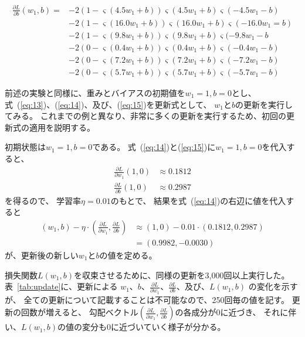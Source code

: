 \begin{align}
  \frac{\partial L}{\partial b}(w_1, b) =
  &\nonumber
    -2 \left(1 - \varsigma(4.5 w_1 + b)\right)\varsigma(4.5 w_1 + b)\varsigma(- 4.5 w_1 - b)
  \\&\nonumber
  -2 \left(1 - \varsigma(16.0 w_1 + b)\right) \varsigma(16.0 w_1 + b)\varsigma(- 16.0 w_1 = b)
  \\&\nonumber
  -2 \left(1 - \varsigma(9.8 w_1 + b)\right)\varsigma(9.8 w_1 + b)\varsigma(- 9.8 w_1 - b
  \\&\nonumber
  -2 \left(0 - \varsigma(0.4 w_1 + b)\right)\varsigma(0.4 w_1 + b)\varsigma(- 0.4 w_1 - b)
  \\&\nonumber
  -2 \left(0 - \varsigma(7.2 w_1 + b)\right)\varsigma(7.2 w_1 + b)\varsigma(- 7.2 w_1 - b)
  \\&\label{eq:15}
  -2 \left(0 - \varsigma(5.7 w_1 + b)\right)\varsigma(5.7 w_1 + b)\varsigma(- 5.7 w_1 - b)
\end{align}

前述の実験と同様に、重みとバイアスの初期値を$w_1 = 1, b = 0$とし、
式~(\ref{eq:13})、(\ref{eq:14})、及び、(\ref{eq:15})を更新式として、
$w_1$と$b$の更新を実行してみる。
これまでの例と異なり、非常に多くの更新を実行するため、初回の更新式の適用を説明する。

初期状態は$w_1 = 1, b = 0$である。
式~(\ref{eq:14})と(\ref{eq:15})に$w_1 = 1, b = 0$を代入すると、
\begin{align*}
    \frac{\partial L}{\partial w_1}(1, 0) & \approx 0.1812
  \\
    \frac{\partial L}{\partial b}(1, 0) & \approx 0.2987
\end{align*}  
を得るので、
学習率$\eta = 0.01$のもとで、
結果を式~(\ref{eq:14})の右辺に値を代入すると
\begin{align*}
  (w_1, b) - \eta \cdot \left(\frac{\partial L}{\partial w_1},
  \frac{\partial L}{\partial b}\right)
  &
  \approx
    (1, 0) - 0.01 \cdot (0.1812, 0.2987)
  \\&
  = (0.9982, -0.0030)
\end{align*}
が、更新後の新しい$w_1$と$b$の値を定める。

損失関数$L(w_1, b)$を収束させるために、同様の更新を3,000回以上実行した。
表~\ref{tab:update}に、更新による
$w_1$、$b$、$\frac{\partial L}{\partial w_1}$、$\frac{\partial L}{\partial b}$、及び、$L(w_1, b)$
の変化を示すが、
全ての更新について記載することは不可能なので、250回毎の値を記す。
更新の回数が増えると、
勾配ベクトル$(\frac{\partial L}{\partial w_1}, \frac{\partial L}{\partial b})$の各成分が0に近づき、
それに伴い、$L(w_1, b)$の値の変分も0に近づいていく様子が分かる。

